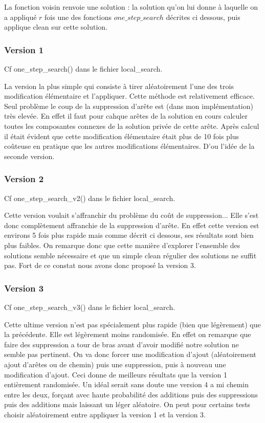 \documentclass[10pt,a4paper]{article}
\begin{document}
La fonction voisin renvoie une solution : la solution qu'on lui donne à laquelle on a appliqué $r$ fois une des fonctions $one\_step\_search$ décrites ci dessous, puis applique clean sur cette solution.

\subsubsection{Version 1}

Cf one\_step\_search() dans le fichier local\_search.

La version la plus simple qui consiste à tirer aléatoirement l'une des trois modification élémentaire et l'appliquer. Cette méthode est relativement efficace. Seul problème le coup de la suppression d'arête est (dans mon implémentation) très elevée. En effet il faut pour cahque arêtes de la solution en cours calculer toutes les composantes connexes de la solution privée de cette arête. Après calcul il était évident que cette modification élémentaire était plus de 10 fois plus coûteuse en pratique que les autres modifications élémentaires. D'ou l'idée de la seconde version.

\subsubsection{Version 2}
Cf one\_step\_search\_v2() dans le fichier local\_search.

Cette version voulait s'affranchir du problème du coût de suppression... Elle s'est donc complètement affranchie de la suppression d'arête. En effet cette version est environs 5 fois plus rapide mais comme décrit ci dessous, ses résultats sont bien plus faibles. On remarque donc que cette manière d'explorer l'ensemble des solutions semble nécessaire et que un simple clean régulier des solutions ne suffit pas. Fort de ce constat nous avons donc proposé la version 3.

\subsubsection{Version 3}

Cf one\_step\_search\_v3() dans le fichier local\_search.

Cette ultime version n'est pas spécialement plus rapide (bien que légèrement) que la précédente. Elle est légèrement moins randomisée. En effet on remarque que faire des suppression a tour de bras avant d'avoir modifié notre solution ne semble pas pertinent. On va donc forcer une modification d'ajout (aléatoirement ajout d'arêtes ou de chemin) puis une suppression, puis à nouveau une modification d'ajout. Ceci donne de meilleurs résultats que la version 1 entièrement randomisée. Un idéal serait sans doute une version 4 a mi chemin entre les deux, forçant avec haute probabilité des additions puis des suppressions puis des additions mais laissant un léger aléatoire. On peut pour certains tests choisir aléatoirement entre appliquer la version 1 et la version 3. 
\end{document}
